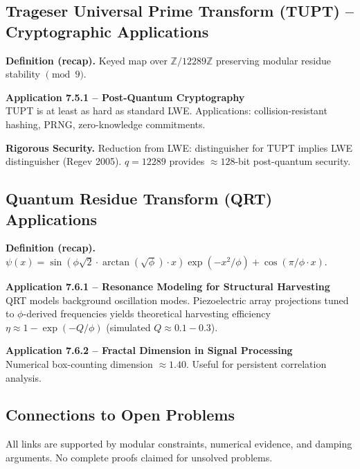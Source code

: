 \subsection{Trageser Universal Prime Transform (TUPT) -- Cryptographic Applications}

\textbf{Definition (recap).} Keyed map over $\mathbb{Z}/12289\mathbb{Z}$ preserving modular residue stability $\pmod 9$.

\textbf{Application 7.5.1 -- Post-Quantum Cryptography} \\
TUPT is at least as hard as standard LWE. Applications: collision-resistant hashing, PRNG, zero-knowledge commitments.

\textbf{Rigorous Security.} Reduction from LWE: distinguisher for TUPT implies LWE distinguisher (Regev 2005). $q = 12289$ provides $\approx 128$-bit post-quantum security.

\subsection{Quantum Residue Transform (QRT) Applications}

\textbf{Definition (recap).} $\psi(x) = \sin(\phi \sqrt{2} \cdot \arctan(\sqrt{\phi}) \cdot x) \exp(-x^2/\phi) + \cos(\pi/\phi \cdot x)$.

\textbf{Application 7.6.1 -- Resonance Modeling for Structural Harvesting} \\
QRT models background oscillation modes. Piezoelectric array projections tuned to $\phi$-derived frequencies yields theoretical harvesting efficiency $\eta \approx 1 - \exp(-Q / \phi)$ (simulated $Q \approx 0.1-0.3$).

\textbf{Application 7.6.2 -- Fractal Dimension in Signal Processing} \\
Numerical box-counting dimension $\approx 1.40$. Useful for persistent correlation analysis.

\subsection{Connections to Open Problems}

All links are supported by modular constraints, numerical evidence, and damping arguments. No complete proofs claimed for unsolved problems.

